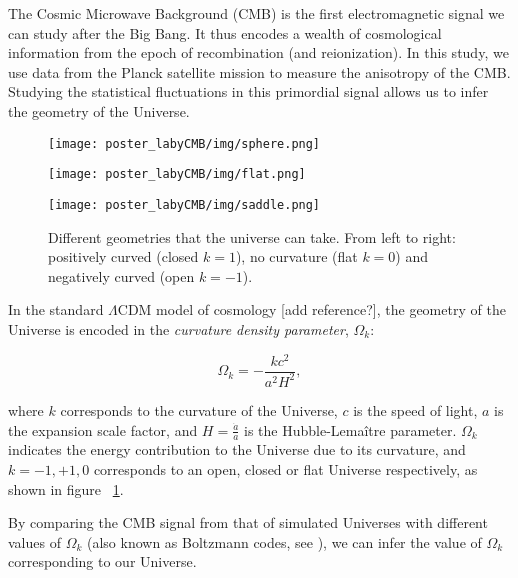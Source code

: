 The Cosmic Microwave Background (CMB) is the first electromagnetic signal we can study after the Big Bang. It thus encodes a wealth of cosmological information from the epoch of recombination (and reionization). In this study, we use data from the Planck satellite mission to measure the anisotropy of the CMB. Studying the statistical fluctuations in this primordial signal allows us to infer the geometry of the Universe.


\vspace{0.5em}
\begin{figure}
	\begin{minipage}{0.3\textwidth}
		\centering\texttt{[image: poster\_labyCMB/img/sphere.png]}
	\end{minipage}
	\hspace{1em}
	\begin{minipage}{0.3\textwidth}
	    \captionsetup{width=2\textwidth}
		\centering\texttt{[image: poster\_labyCMB/img/flat.png]}
		\hspace{14em}\caption{Different geometries that the universe can take. From left to right: positively curved (closed $k=1$), no curvature (flat $k=0$) and negatively curved (open $k=-1$).}
		\label{fig:geometries}
	\end{minipage}
	\hspace{1em}
	\begin{minipage}{0.3\textwidth} 
		\centering\texttt{[image: poster\_labyCMB/img/saddle.png]}
	\end{minipage}
\end{figure}

In the standard $\Lambda$CDM model of cosmology [add reference?], the geometry of the Universe is encoded in the \textit{curvature density parameter}, $\Omega_k$:

\begin{equation}
    \Omega_{k}=-\frac{k c^{2}}{a^{2} H^{2}},
\end{equation}
\hspace{1em} 

where $k$ corresponds to the curvature of the Universe, $c$ is the speed of light, $a$ is the expansion scale factor, and $H = \frac{\dot{a}}{a}$ is the Hubble-Lemaître parameter. $\Omega_k$ indicates the energy contribution to the Universe due to its curvature, and $k = −1, +1, 0$ corresponds to an open, closed or flat Universe respectively, as shown in figure ~\ref{fig:geometries}.

By comparing the CMB signal from that of simulated Universes with different values of $\Omega_k$ (also known as Boltzmann codes, see \cite{lesgourgues:2011}), we can infer the value of $\Omega_k$ corresponding to our Universe. 